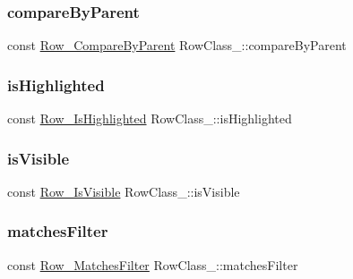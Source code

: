 \subsubsection{\texorpdfstring{compare\+By\+Parent}{compareByParent}}
{\footnotesize\ttfamily const \hyperlink{Row_8h_a98170315e8c78545311121660583147f}{Row\+\_\+\+Compare\+By\+Parent} Row\+Class\+\_\+\+::compare\+By\+Parent}

\mbox{\label{structRowClass___a79fe411190eaa703c46ec7cf7d9994ae}} 
\subsubsection{\texorpdfstring{is\+Highlighted}{isHighlighted}}
{\footnotesize\ttfamily const \hyperlink{Row_8h_aacc6c35bb344756ec17fd975b2539e03}{Row\+\_\+\+Is\+Highlighted} Row\+Class\+\_\+\+::is\+Highlighted}

\mbox{\label{structRowClass___a3bc16c5a9768d03458ccb3bf04736aca}} 
\subsubsection{\texorpdfstring{is\+Visible}{isVisible}}
{\footnotesize\ttfamily const \hyperlink{Row_8h_a08d2a190b74ac8186225e90c378d6cc2}{Row\+\_\+\+Is\+Visible} Row\+Class\+\_\+\+::is\+Visible}

\mbox{\label{structRowClass___a4bf18b4d66cfc8138c92aa174b4554cb}} 
\subsubsection{\texorpdfstring{matches\+Filter}{matchesFilter}}
{\footnotesize\ttfamily const \hyperlink{Row_8h_a70a6514fbcdaef7ce30f91127f13a62a}{Row\+\_\+\+Matches\+Filter} Row\+Class\+\_\+\+::matches\+Filter}

\mbox{\label{structRowClass___ac3f824b7c7c6987e44cc185ebe9ebf1c}} 
